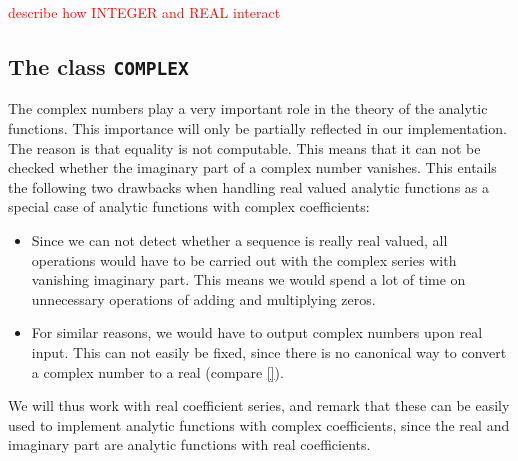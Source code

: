 \documentclass{article}
\newcommand{\ir}[1]{\texttt{#1}}
\newcommand{\temp}[1]{\textcolor{red}{#1}}
\begin{document}
\temp{describe how INTEGER and REAL interact}

\subsection{The class \ir{COMPLEX}}\label{sec: The class COMPLEX}

The complex numbers play a very important role in the theory of the analytic functions. This importance will only be partially reflected in our implementation. The reason is that equality is not computable. This means that it can not be checked whether the imaginary part of a complex number vanishes. This entails the following two drawbacks when handling real valued analytic functions as a special case of analytic functions with complex coefficients:
\begin{itemize}
\item Since we can not detect whether a sequence is really real valued, all operations would have to be carried out with the complex series with vanishing imaginary part. This means we would spend a lot of time on unnecessary operations of adding and multiplying zeros.
\item For similar reasons, we would have to output complex numbers upon real input. This can not easily be fixed, since there is no canonical way to convert a complex number to a real (compare \cref{}).
\end{itemize}
We will thus work with real coefficient series, and remark that these can be easily used to implement analytic functions with complex coefficients, since the real and imaginary part are analytic functions with real coefficients.
\end{document}

